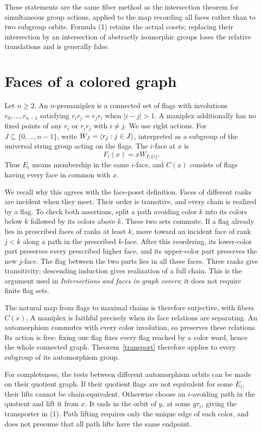 \documentclass[a4paper,11pt]{article}
\begin{document}
These statements are the same fiber method as the intersection theorem
for simultaneous group actions, applied to the map recording all faces
rather than to two subgroup orbits. Formula (1) retains the actual
cosets; replacing their intersection by an intersection of abstractly
isomorphic groups loses the relative translations and is generally false.

\section{Faces of a colored graph}
Let $n\geq2$. An $n$-premaniplex is a connected set of flags with
involutions $r_0,\ldots,r_{n-1}$ satisfying $r_ir_j=r_jr_i$ when
$|i-j|>1$. A maniplex additionally has no fixed points of any $r_i$
or $r_ir_j$ with $i\ne j$. We use right actions. For
$J\subseteq\{0,\ldots,n-1\}$, write $W_J=\langle r_j:j\in J\rangle$,
interpreted as a subgroup of the universal string group acting on the flags.
The $i$-face at $x$ is
\[
 F_i(x)=xW_{I\setminus\{i\}}.
\]
Thus $E_i$ means membership in the same $i$-face, and $C(x)$ consists
of flags having every face in common with $x$.

We recall why this agrees with the face-poset definition. Faces of
different ranks are incident when they meet. Their order is transitive,
and every chain is realized by a flag. To check both assertions, split
a path avoiding color $k$ into its colors below $k$ followed by its
colors above $k$. These two sets commute. If a flag already lies in
prescribed faces of ranks at least $k$, move toward an incident face
of rank $j<k$ along a path in the prescribed $k$-face. After this
reordering, its lower-color part preserves every prescribed higher
face, and its upper-color part preserves the new $j$-face. The flag
between the two parts lies in all these faces. Three ranks give
transitivity; descending induction gives realization of a full chain.
This is the argument used in \emph{Intersections and faces in graph
covers}; it does not require finite flag sets.

The natural map from flags to maximal chains is therefore surjective,
with fibers $C(x)$. A maniplex is faithful precisely when its face
relations are separating. An automorphism commutes with every color
involution, so preserves these relations. Its action is free: fixing
one flag fixes every flag reached by a color word, hence the whole
connected graph. Theorem~\ref{transport} therefore applies to every
subgroup of its automorphism group.

For completeness, the tests between different automorphism orbits can
be made on their quotient graph. If their quotient flags are not
equivalent for some $E_i$, their lifts cannot be chain-equivalent.
Otherwise choose an $i$-avoiding path in the quotient and lift it
from $x$. It ends in the orbit of $y$, at some $y\tau_i$, giving
the transporter in (1). Path lifting requires only the unique edge
of each color, and does not presume that all path lifts have the
same endpoint.
\end{document}
